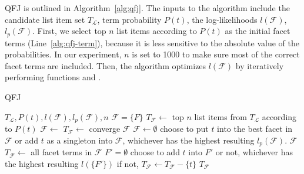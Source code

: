QFJ is outlined in Algorithm~\ref{alg:qfj}. The inputs to the algorithm include the candidate list item set $T_{\mathcal{L}}$, term probability $P(t)$, the log-likelihoods $l(\mathcal{F})$, $l_p(\mathcal{F})$.
First, we select top $n$ list items according to $P(t)$ as the initial facet terms (Line~\ref{alg:qfj-term}), because it is less sensitive to the absolute value of the probabilities.
In our experiment, $n$ is set to 1000 to make sure most of the correct facet terms are included.
Then, the algorithm optimizes $l(\mathcal{F})$ by iteratively performing functions  and .

\begin{algorithm}[h!]
 \caption{QFJ}
\label{alg:qfj}
\begin{algorithmic}[1]
  \Require $T_{\mathcal{L}}, P(t), l(\mathcal{F}), l_p(\mathcal{F}), n$
  \Ensure $\mathcal{F}=\{F\}$
  \State $T_\mathcal{F} \leftarrow$ top $n$ list items from $T_{\mathcal{L}}$ according to $P(t)$ \label{alg:qfj-term}
  \Repeat
  \State $\mathcal{F}\leftarrow$ 
  \State $T_\mathcal{F}\leftarrow$ 
  \Until converge
  \State \Return $\mathcal{F}$
  \State
    \State $\mathcal{F} \leftarrow \emptyset$ 
     \label{alg:cluster-b}
      \State choose to put $t$ into the best facet in $\mathcal{F}$ 
      \State or add $t$ as a singleton into $\mathcal{F}$, 
      \State whichever has the highest resulting $l_p(\mathcal{F})$.
    \EndFor \label{alg:cluster-e}
  \State \Return $\mathcal{F}$
  \EndFunction 
  \State
{}
  \State $T_\mathcal{F}\leftarrow$ all facet terms in $\mathcal{F}$
    \State $F'=\emptyset$
     \label{alg:qfj-check}
      \State choose to add $t$ into $F'$ or not,
      \State whichever has the highest resulting $l(\{F'\})$
      \State if not, $T_\mathcal{F}\leftarrow T_\mathcal{F} - \{t\}$ \label{alg:qfj-remove}
    \EndFor
  \EndFor
  \State \Return  $T_\mathcal{F}$ \label{alg:qfj-return}
\EndFunction 
\end{algorithmic}
\end{algorithm}

